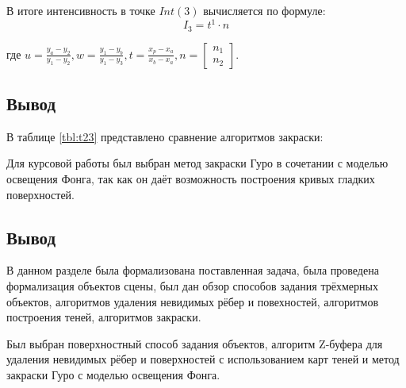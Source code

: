 В итоге интенсивность в точке $Int(3)$ вычисляется по формуле:
\begin{equation}
	I_3 = t^1 \cdot n
\end{equation}

где $u = \frac{y_a-y_2}{y_1-y_2}, w = \frac{y_1-y_b}{y_1-y_3}, t = \frac{x_p-x_a}{x_b-x_a}, n = \begin{bmatrix}
	n_1\\
	n_2
\end{bmatrix}.$

\subsection*{Вывод}

В таблице \ref{tbl:t23} представлено сравнение алгоритмов закраски:


Для курсовой работы был выбран метод закраски Гуро в сочетании с моделью освещения Фонга, так как он даёт возможность построения кривых гладких поверхностей.

\subsection*{Вывод}

В данном разделе была формализована поставленная задача, была проведена формализация объектов сцены, был дан обзор способов задания трёхмерных объектов, алгоритмов удаления невидимых рёбер и повехностей, алгоритмов построения теней, алгоритмов закраски. 

Был выбран поверхностный способ задания объектов, алгоритм Z-буфера для удаления невидимых рёбер и поверхностей с использованием карт теней и метод закраски Гуро с моделью освещения Фонга.





	